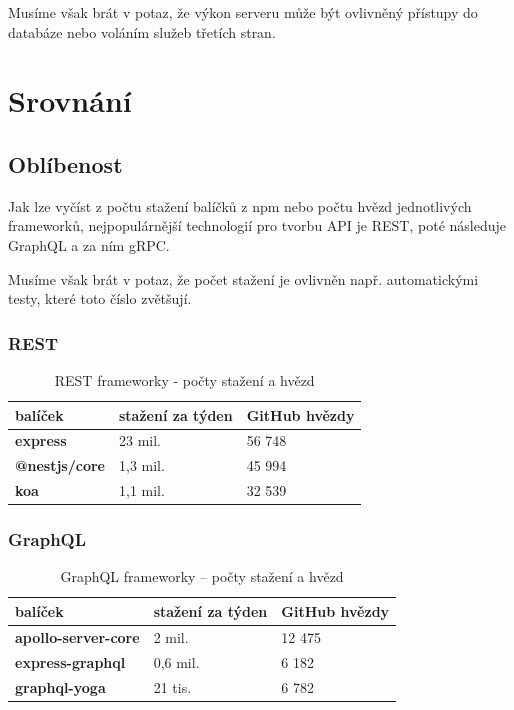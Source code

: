 \documentclass[thesis=M,czech]{FITthesis}[2019/12/23]
\begin{document}
Musíme však brát v potaz, že výkon serveru může být ovlivněný přístupy do databáze nebo voláním služeb třetích stran.

\section{Srovnání}

\subsection{Oblíbenost}
Jak lze vyčíst z počtu stažení balíčků z npm nebo počtu hvězd jednotlivých frameworků, nejpopulárnější technologií pro tvorbu API je REST, poté následuje GraphQL a za ním gRPC.

Musíme však brát v potaz, že počet stažení je ovlivněn např. automatickými testy, které toto číslo zvětšují.

\subsubsection*{REST}
\begin{table}[h]
  \begin{tabular}{|l|l|l|}
  \hline
  \textbf{balíček}      & \textbf{stažení za týden}     & \textbf{GitHub hvězdy} \\ \hline
  \textbf{express}      & 23 mil.                       & 56 748                 \\ \hline
  \textbf{@nestjs/core} & 1,3 mil.                      & 45 994                 \\ \hline
  \textbf{koa}          & 1,1 mil.                      & 32 539                 \\ \hline
  \end{tabular}
  \caption{REST frameworky - počty stažení a hvězd \cite{rest_trends}}
\end{table}

\subsubsection*{GraphQL}
\begin{table}[h]
  \begin{tabular}{|l|l|l|}
  \hline
  \textbf{balíček}                                 & \textbf{stažení za týden}                           & \textbf{GitHub hvězdy} \\ \hline
  \textbf{apollo-server-core}                      & 2 mil.                                              & 12 475                 \\ \hline
  \textbf{express-graphql}                         & 0,6 mil.                                            & 6 182                  \\ \hline
  \textbf{graphql-yoga}                            & 21 tis.                                             & 6 782                  \\ \hline
  \end{tabular}
  \caption{GraphQL frameworky -- počty stažení a hvězd \cite{graphql_trends}}
\end{table}
\end{document}
